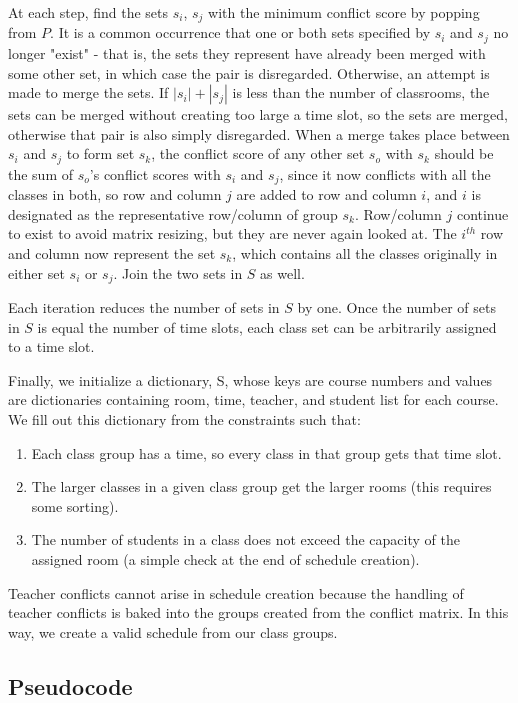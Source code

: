 \documentclass[11pt, oneside]{article}   	%
\begin{document}
 At each step, find the sets $s_i$, $s_j$ with the minimum conflict score by popping from $P$. It is a common occurrence that one or both sets specified by $s_i$ and $s_j$ no longer "exist" - that is, the sets they represent have already been merged with some other set, in which case the pair is disregarded. Otherwise, an attempt is made to merge the sets. If $|s_i| + |s_j|$ is less than the number of classrooms, the sets can be merged without creating too large a time slot, so the sets are merged, otherwise that pair is also simply disregarded. When a merge takes place between $s_i$ and $s_j$ to form set $s_k$, the conflict score of any other set $s_o$ with $s_k$ should be the sum of $s_o$'s conflict scores with $s_i$ and $s_j$, since it now conflicts with all the classes in both, so row and column $j$ are added to row and column $i$, and $i$ is designated as the representative row/column of group $s_k$. Row/column $j$ continue to exist to avoid matrix resizing, but they are never again looked at. The $i^{th}$ row and column now represent the set $s_k$, which contains all the classes originally in either set $s_i$ or $s_j$. Join the two sets in $S$ as well.

Each iteration reduces the number of sets in $S$ by one. Once the number of sets in $S$ is equal the number of time slots, each class set can be arbitrarily assigned to a time slot.

Finally, we initialize a dictionary, S, whose keys are course numbers and values are dictionaries containing room, time, teacher, and student list for each course. We fill out this dictionary from the constraints such that:
\begin{enumerate}
    \item Each class group has a time, so every class in that group gets that time slot.
    \item The larger classes in a given class group get the larger rooms (this requires some sorting).
    \item The number of students in a class does not exceed the capacity of the assigned room (a simple check at the end of schedule creation).
\end{enumerate}

Teacher conflicts cannot arise in schedule creation because the handling of teacher conflicts is baked into the groups created from the conflict matrix. In this way, we create a valid schedule from our class groups.

\subsection{Pseudocode}
\begin{algorithm}
\end{algorithm}
\end{document}
